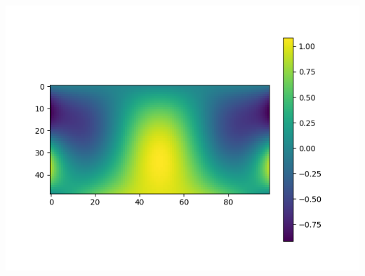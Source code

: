 \documentclass{article}
\begin{document}
\includegraphics[width=\linewidth]{Figure_1.png}

\end{document}
